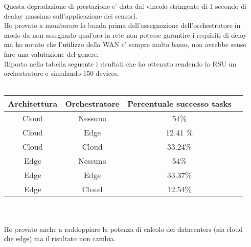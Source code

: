 \documentclass[12pt, a4paper]{report} %
\begin{document}
\begin{itemize}
	Questa degradazione di prestazione e' data dal vincolo stringente di 1 secondo di dealay massimo sull'applicazione dei sensori.\\
	Ho provato a monitorare la banda prima dell'assegnazione dell'orchestratore in modo da non assegnarlo qual'ora la rete non potesse garantire i requisiti di delay ma ho notato che l'utilizzo della WAN e' sempre molto basso, non avrebbe senso fare una valutazione del genere.\\
	Riporto nella tabella seguente i risultati che ho ottenuto rendendo la RSU un orchestratore e simulando 150 devices.\\
	\\
 	\begin{tabular}{| c | c | c || c ||} %
		\hline
		Architettura & Orchestratore & Percentuale successo tasks\\ [1ex] 
		\hline
		\hline
		Cloud & Nessuno & 54\%\\
		\hline
		Cloud & Edge & 12.41 \%\\
		\hline
		Cloud & Cloud & 33.24\%\\
		\hline
		Edge & Nessuno & 54\%\\
		\hline
		Edge & Edge & 33.37\%\\
		\hline
		Edge & Cloud & 12.54\%\\
		\hline
\end{tabular}
	\\
	\\
	Ho provato anche a raddoppiare la potenza di calcolo dei datacenters (sia cloud che edge) ma il risultato non cambia.
 	\end{itemize}
\end{document}
